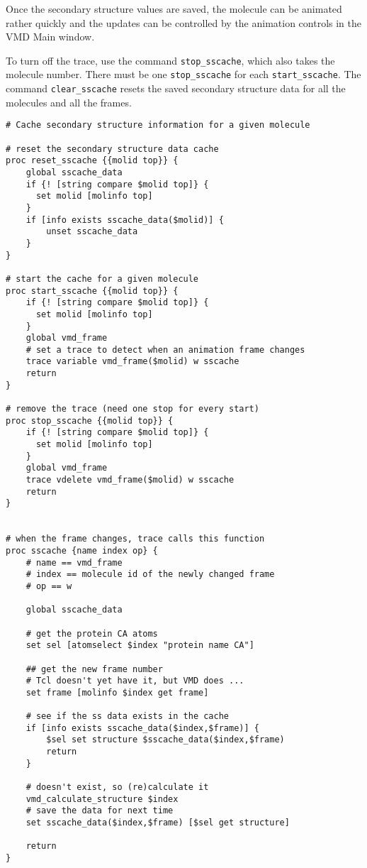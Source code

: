   Once the secondary structure values are saved, the molecule can be
animated rather quickly and the updates can be controlled by the
animation controls in the VMD Main window.

  To turn off the trace, use the command {\tt stop\_sscache}, which
also takes the molecule number.  There must be one {\tt stop\_sscache}
for each {\tt start\_sscache}.  The command {\tt clear\_sscache} resets
the saved secondary structure data for all the molecules and all the
frames.

\begin{verbatim}
# Cache secondary structure information for a given molecule

# reset the secondary structure data cache
proc reset_sscache {{molid top}} {
    global sscache_data
    if {! [string compare $molid top]} {
      set molid [molinfo top]
    }
    if [info exists sscache_data($molid)] {
        unset sscache_data
    }
}

# start the cache for a given molecule
proc start_sscache {{molid top}} {
    if {! [string compare $molid top]} {
      set molid [molinfo top]
    }
    global vmd_frame
    # set a trace to detect when an animation frame changes
    trace variable vmd_frame($molid) w sscache
    return
}

# remove the trace (need one stop for every start)
proc stop_sscache {{molid top}} {
    if {! [string compare $molid top]} {
      set molid [molinfo top]
    }
    global vmd_frame
    trace vdelete vmd_frame($molid) w sscache
    return
}


# when the frame changes, trace calls this function
proc sscache {name index op} {
    # name == vmd_frame
    # index == molecule id of the newly changed frame
    # op == w
    
    global sscache_data

    # get the protein CA atoms
    set sel [atomselect $index "protein name CA"]

    ## get the new frame number
    # Tcl doesn't yet have it, but VMD does ...
    set frame [molinfo $index get frame]

    # see if the ss data exists in the cache
    if [info exists sscache_data($index,$frame)] {
        $sel set structure $sscache_data($index,$frame)
        return
    }

    # doesn't exist, so (re)calculate it
    vmd_calculate_structure $index
    # save the data for next time
    set sscache_data($index,$frame) [$sel get structure]

    return
}
\end{verbatim}

